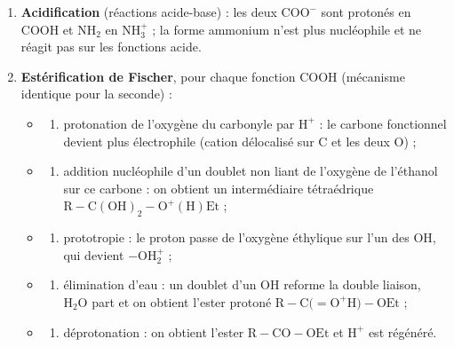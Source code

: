 \documentclass[11pt,a4paper]{article}
\providecommand{\tightlist}{\setlength{\itemsep}{0pt}\setlength{\parskip}{0pt}}
\begin{document}
\begin{enumerate}
\def\labelenumi{\arabic{enumi}.}
\tightlist
\item
  \textbf{Acidification} (réactions acide-base) : les deux \(\mathrm{COO^-}\) sont protonés en COOH et \(\mathrm{NH_2}\) en \(\mathrm{NH_3^+}\) ; la forme ammonium n'est plus nucléophile et ne réagit pas sur les fonctions acide.
\item
  \textbf{Estérification de Fischer}, pour chaque fonction COOH (mécanisme identique pour la seconde) :

  \begin{itemize}
  \item
    \begin{enumerate}
    \def\labelenumii{(\alph{enumii})}
    \tightlist
    \item
      protonation de l'oxygène du carbonyle par \(\mathrm{H^+}\) : le carbone fonctionnel devient plus électrophile (cation délocalisé sur C et les deux O) ;
    \end{enumerate}
  \item
    \begin{enumerate}
    \def\labelenumii{(\alph{enumii})}
    \setcounter{enumii}{1}
    \tightlist
    \item
      addition nucléophile d'un doublet non liant de l'oxygène de l'éthanol sur ce carbone : on obtient un intermédiaire tétraédrique \(\mathrm{R{-}C(OH)_2{-}O^+(H)Et}\) ;
    \end{enumerate}
  \item
    \begin{enumerate}
    \def\labelenumii{(\alph{enumii})}
    \setcounter{enumii}{2}
    \tightlist
    \item
      prototropie : le proton passe de l'oxygène éthylique sur l'un des OH, qui devient \(\mathrm{{-}OH_2^+}\) ;
    \end{enumerate}
  \item
    \begin{enumerate}
    \def\labelenumii{(\alph{enumii})}
    \setcounter{enumii}{3}
    \tightlist
    \item
      élimination d'eau : un doublet d'un OH reforme la double liaison, \(\mathrm{H_2O}\) part et on obtient l'ester protoné \(\mathrm{R{-}C(} = \mathrm{O^+H){-}OEt}\) ;
    \end{enumerate}
  \item
    \begin{enumerate}
    \def\labelenumii{(\alph{enumii})}
    \setcounter{enumii}{4}
    \tightlist
    \item
      déprotonation : on obtient l'ester \(\mathrm{R{-}CO{-}OEt}\) et \(\mathrm{H^+}\) est régénéré.
    \end{enumerate}
  \end{itemize}
\end{enumerate}
\end{document}
